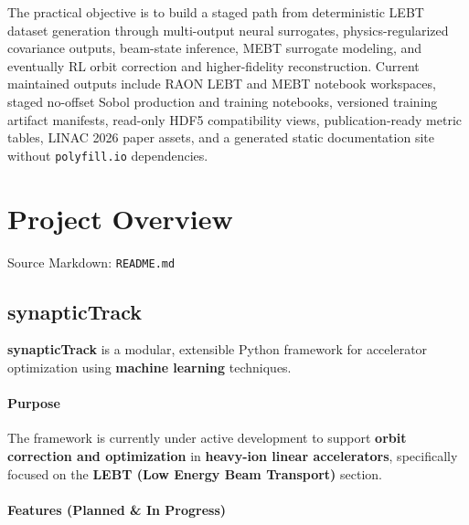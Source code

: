 \documentclass[
]{article}
\begin{document}
The practical objective is to build a staged path from deterministic
LEBT dataset generation through multi-output neural surrogates,
physics-regularized covariance outputs, beam-state inference, MEBT
surrogate modeling, and eventually RL orbit correction and
higher-fidelity reconstruction. Current maintained outputs include RAON
LEBT and MEBT notebook workspaces, staged no-offset Sobol production and
training notebooks, versioned training artifact manifests, read-only
HDF5 compatibility views, publication-ready metric tables, LINAC 2026
paper assets, and a generated static documentation site without
\texttt{polyfill.io} dependencies.

\hypertarget{project-overview}{%
\section{Project Overview}\label{project-overview}}

Source Markdown: \texttt{README.md}

\hypertarget{synaptictrack}{%
\subsection{synapticTrack}\label{synaptictrack}}

\textbf{synapticTrack} is a modular, extensible Python framework for
accelerator optimization using \textbf{machine learning} techniques.

\hypertarget{purpose}{%
\paragraph{Purpose}\label{purpose}}

The framework is currently under active development to support
\textbf{orbit correction and optimization} in \textbf{heavy-ion linear
accelerators}, specifically focused on the \textbf{LEBT (Low Energy Beam
Transport)} section.

\hypertarget{features-planned-in-progress}{%
\paragraph{Features (Planned \& In
Progress)}\label{features-planned-in-progress}}
\end{document}
